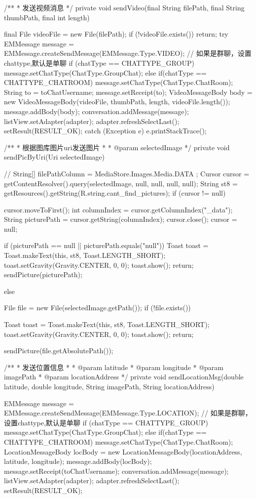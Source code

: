 {	/**
	 * 发送视频消息
	 */
	private void sendVideo(final String filePath, final String thumbPath, final int length) {
		final File videoFile = new File(filePath);
		if (!videoFile.exists()) {
			return;
		}
		try {
			EMMessage message = EMMessage.createSendMessage(EMMessage.Type.VIDEO);
			// 如果是群聊，设置chattype,默认是单聊
			if (chatType == CHATTYPE_GROUP){
				message.setChatType(ChatType.GroupChat);
			}else if(chatType == CHATTYPE_CHATROOM){
			    message.setChatType(ChatType.ChatRoom);
			}
			String to = toChatUsername;
			message.setReceipt(to);
			VideoMessageBody body = new VideoMessageBody(videoFile, thumbPath, length, videoFile.length());
			message.addBody(body);
			conversation.addMessage(message);
			listView.setAdapter(adapter);
			adapter.refreshSelectLast();
			setResult(RESULT_OK);
		} catch (Exception e) {
			e.printStackTrace();
		}

	}

	/**
	 * 根据图库图片uri发送图片
	 * 
	 * @param selectedImage
	 */
	private void sendPicByUri(Uri selectedImage) {
		// String[] filePathColumn = { MediaStore.Images.Media.DATA };
		Cursor cursor = getContentResolver().query(selectedImage, null, null, null, null);
		String st8 = getResources().getString(R.string.cant_find_pictures);
		if (cursor != null) {
			cursor.moveToFirst();
			int columnIndex = cursor.getColumnIndex("_data");
			String picturePath = cursor.getString(columnIndex);
			cursor.close();
			cursor = null;

			if (picturePath == null || picturePath.equals("null")) {
				Toast toast = Toast.makeText(this, st8, Toast.LENGTH_SHORT);
				toast.setGravity(Gravity.CENTER, 0, 0);
				toast.show();
				return;
			}
			sendPicture(picturePath);
		} else {
			File file = new File(selectedImage.getPath());
			if (!file.exists()) {
				Toast toast = Toast.makeText(this, st8, Toast.LENGTH_SHORT);
				toast.setGravity(Gravity.CENTER, 0, 0);
				toast.show();
				return;

			}
			sendPicture(file.getAbsolutePath());
		}

	}

	/**
	 * 发送位置信息
	 * 
	 * @param latitude
	 * @param longitude
	 * @param imagePath
	 * @param locationAddress
	 */
	private void sendLocationMsg(double latitude, double longitude, String imagePath, String locationAddress) {
		EMMessage message = EMMessage.createSendMessage(EMMessage.Type.LOCATION);
		// 如果是群聊，设置chattype,默认是单聊
		if (chatType == CHATTYPE_GROUP){
			message.setChatType(ChatType.GroupChat);
		}else if(chatType == CHATTYPE_CHATROOM){
		    message.setChatType(ChatType.ChatRoom);
		}
		LocationMessageBody locBody = new LocationMessageBody(locationAddress, latitude, longitude);
		message.addBody(locBody);
		message.setReceipt(toChatUsername);
		conversation.addMessage(message);
		listView.setAdapter(adapter);
		adapter.refreshSelectLast();
		setResult(RESULT_OK);

}}
